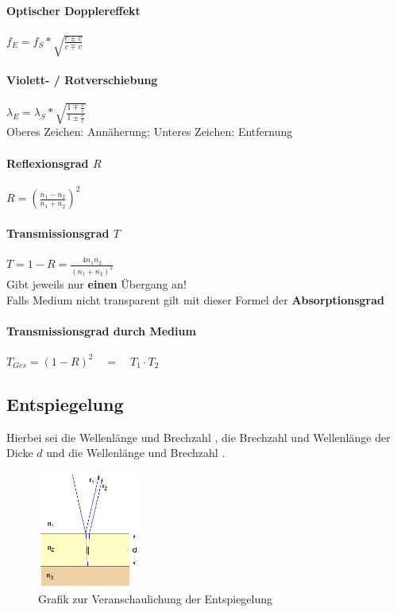 \documentclass[12pt, a4paper]{scrreprt}
\begin{document}
\paragraph{Optischer Dopplereffekt} \dotfill \(f_E = f_S* \sqrt{\frac{c \pm v}{c \mp v}}\)
\paragraph{Violett- / Rotverschiebung} \dotfill \(\lambda_E = \lambda_S*\sqrt{\frac{1 \mp \frac{v}{c}}{1 \pm \frac{v}{c}}}\)\\
\myhspace{} \textcolor{myred}{Oberes Zeichen: Annäherung; Unteres Zeichen: Entfernung}
\paragraph{Reflexionsgrad \(R\)} \dotfill \(R = {\left( \frac{n_1 - n_2}{n_1 + n_2} \right)}^2\)
\paragraph{Transmissionsgrad \(T\)} \dotfill \(T = 1 - R = \frac{4 n_1 n_2}{{(n_1 + n_2)}^2}\)\\
\myhspace{} Gibt jeweils nur \textbf{einen} Übergang an!\\
\myhspace{} Falls Medium nicht transparent gilt mit dieser Formel der \textbf{Absorptionsgrad}
\paragraph{Transmissionsgrad \textbf{durch} Medium} \dotfill \(T_{Ges} = {(1 - R)}^2 \quad = \quad T_1 \cdot T_2\)


\subsection{Entspiegelung}
Hierbei sei  die Wellenlänge und Brechzahl ,  die Brechzahl und Wellenlänge  der Dicke \(d\) und  die Wellenlänge und Brechzahl .

\begin{figure}[H]
  \centering
  \includegraphics[width = 0.3\textwidth]{./Grafiken/Entspiegelung.png}
  \caption[Entspiegelung]{Grafik zur Veranschaulichung der Entspiegelung}
  \label{fig:Entspiegelung}
\end{figure}
\end{document}
